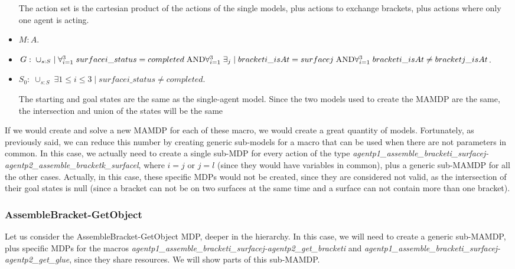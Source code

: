 \begin{itemize}
	The action set is the cartesian product of the actions of the single models, plus actions to exchange brackets, plus actions where only one agent is acting.
	\item $M: A$.
	\item $G:\; \cup_{s:S}\; |\; \forall_{i=1}^3\; surfacei\_status=completed\;\text{AND}\\
	\forall_{i=1}^3\; \exists_{j}\;|\;bracketi\_isAt=surfacej\; \text{AND}\\
	\forall_{i=1}^3\; bracketi\_isAt \neq bracketj\_isAt$.
	\item $S_0:\; \cup_{s:S} \; \exists{1\leq i \leq 3}\; |\; surfacei\_status \neq completed$.

	The starting and goal states are the same as the single-agent model. Since the two models used to create the MAMDP are the same, the intersection and union of the states will be the same
\end{itemize}


If we would create and solve a new MAMDP for each of these macro, we would create a great quantity of models. Fortunately, as previously said, we can reduce this number by creating generic sub-models for a macro that can be used when there are not parameters in common. In this case, we actually need to create a single sub-MDP for every action of the type \textit{agentp1\_assemble\_bracketi\_surfacej-agentp2\_assemble\_bracketk\_surfacel}, where $i=j$ or $j=l$ (since they would have variables in common), plus a generic sub-MAMDP for all the other cases. Actually, in this case, these specific MDPs would not be created, since they are considered not valid, as the intersection of their goal states is null (since a bracket can not be on two surfaces at the same time and a surface can not contain more than one bracket).


\subsubsection{AssembleBracket-GetObject}
Let us consider the AssembleBracket-GetObject MDP, deeper in the hierarchy. In this case, we will need to create a generic sub-MAMDP, plus specific MDPs for the macros \textit{agentp1\_assemble\_bracketi\_surfacej-agentp2\_get\_bracketi} and \textit{agentp1\_assemble\_bracketi\_surfacej-agentp2\_get\_glue}, since they share resources. We will show parts of this sub-MAMDP.  


